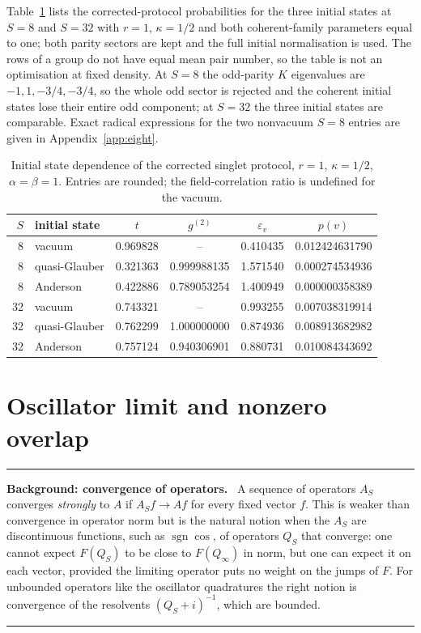 \documentclass[11pt,a4paper]{article}
\newcommand{\sgn}{\operatorname{sgn}}
\newenvironment{background}[1]{\par\medskip\noindent\hrule\smallskip\noindent\textbf{Background: #1.}\ \ignorespaces}{\par\smallskip\noindent\hrule\medskip}
\begin{document}
Table~\ref{tab:initial} lists the corrected-protocol probabilities for the three initial states at $S=8$ and $S=32$ with $r=1$, $\kappa=1/2$ and both coherent-family parameters equal to one; both parity sectors are kept and the full initial normalisation is used. The rows of a group do not have equal mean pair number, so the table is not an optimisation at fixed density. At $S=8$ the odd-parity $K$ eigenvalues are $-1,1,-3/4,-3/4$, so the whole odd sector is rejected and the coherent initial states lose their entire odd component; at $S=32$ the three initial states are comparable. Exact radical expressions for the two nonvacuum $S=8$ entries are given in Appendix~\ref{app:eight}.

\begin{table}[t]
\centering
\small
\begin{tabular}{rlcccc}
\toprule
$S$ & initial state & $t$ & $g^{(2)}$ & $\varepsilon_v$ & $p(v)$\\
\midrule
8 & vacuum & 0.969828 & -- & 0.410435 & 0.012424631790\\
8 & quasi-Glauber & 0.321363 & 0.999988135 & 1.571540 & 0.000274534936\\
8 & Anderson & 0.422886 & 0.789053254 & 1.400949 & 0.000000358389\\
32 & vacuum & 0.743321 & -- & 0.993255 & 0.007038319914\\
32 & quasi-Glauber & 0.762299 & 1.000000000 & 0.874936 & 0.008913682982\\
32 & Anderson & 0.757124 & 0.940306901 & 0.880731 & 0.010084343692\\
\bottomrule
\end{tabular}
\caption{Initial state dependence of the corrected singlet protocol, $r=1$, $\kappa=1/2$, $\alpha=\beta=1$. Entries are rounded; the field-correlation ratio is undefined for the vacuum.}
\label{tab:initial}
\end{table}

\section{Oscillator limit and nonzero overlap}
\label{sec:limit}

\begin{background}{convergence of operators}
A sequence of operators $A_S$ converges \emph{strongly} to $A$ if $A_Sf\to Af$ for every fixed vector $f$. This is weaker than convergence in operator norm but is the natural notion when the $A_S$ are discontinuous functions, such as $\sgn\cos$, of operators $Q_S$ that converge: one cannot expect $F(Q_S)$ to be close to $F(Q_\infty)$ in norm, but one can expect it on each vector, provided the limiting operator puts no weight on the jumps of $F$. For unbounded operators like the oscillator quadratures the right notion is convergence of the resolvents $(Q_S+i)^{-1}$, which are bounded.
\end{background}
\end{document}
